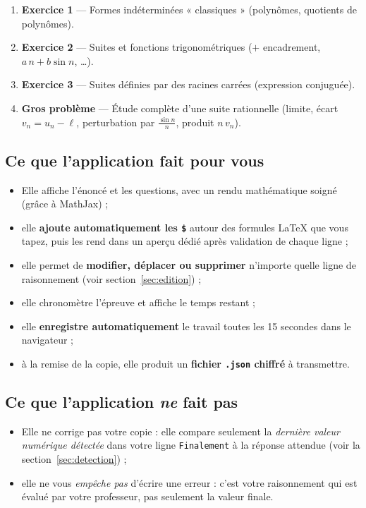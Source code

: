 \documentclass[11pt,a4paper]{article}
\begin{document}
\begin{enumerate}
  \item \textbf{Exercice 1} — Formes indéterminées « classiques »
        (polynômes, quotients de polynômes).
  \item \textbf{Exercice 2} — Suites et fonctions trigonométriques
        (\(+\) encadrement, \(a\,n + b\sin n\), \dots).
  \item \textbf{Exercice 3} — Suites définies par des racines carrées
        (expression conjuguée).
  \item \textbf{Gros problème} — Étude complète d'une suite rationnelle
        (limite, écart \(v_n = u_n - \ell\), perturbation par \(\tfrac{\sin n}{n}\),
        produit \(n\,v_n\)).
\end{enumerate}

\subsection*{Ce que l'application fait pour vous}
\begin{itemize}
  \item Elle affiche l'énoncé et les questions, avec un rendu mathématique soigné
        (grâce à MathJax) ;
  \item elle \textbf{ajoute automatiquement les \texttt{\$}} autour des formules
        \LaTeX{} que vous tapez, puis les rend dans un aperçu dédié après
        validation de chaque ligne ;
  \item elle permet de \textbf{modifier, déplacer ou supprimer} n'importe quelle
        ligne de raisonnement (voir section~\ref{sec:edition}) ;
  \item elle chronomètre l'épreuve et affiche le temps restant ;
  \item elle \textbf{enregistre automatiquement} le travail toutes les 15 secondes
        dans le navigateur ;
  \item à la remise de la copie, elle produit un \textbf{fichier \texttt{.json}
        chiffré} à transmettre.
\end{itemize}

\subsection*{Ce que l'application \emph{ne} fait pas}
\begin{itemize}
  \item Elle ne corrige pas votre copie : elle compare seulement la
        \emph{dernière valeur numérique détectée} dans votre ligne
        \texttt{Finalement} à la réponse attendue (voir la
        section~\ref{sec:detection}) ;
  \item elle ne vous \emph{empêche pas} d'écrire une erreur : c'est votre
        raisonnement qui est évalué par votre professeur, pas seulement la
        valeur finale.
\end{itemize}
\end{document}
